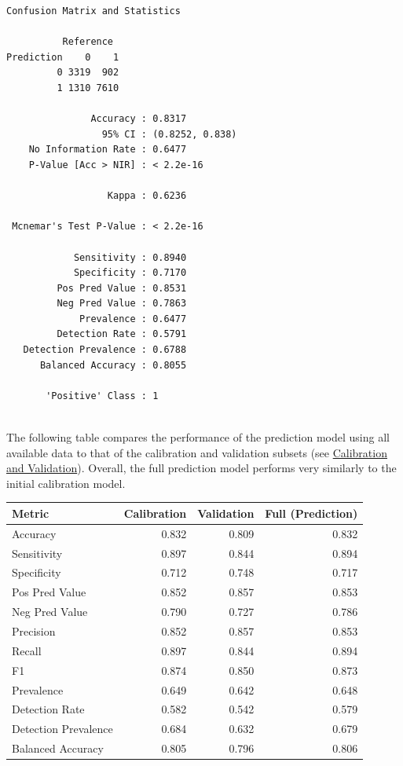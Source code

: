 \documentclass[
]{book}
\begin{document}
\begin{verbatim}
Confusion Matrix and Statistics

          Reference
Prediction    0    1
         0 3319  902
         1 1310 7610
                                         
               Accuracy : 0.8317         
                 95% CI : (0.8252, 0.838)
    No Information Rate : 0.6477         
    P-Value [Acc > NIR] : < 2.2e-16      
                                         
                  Kappa : 0.6236         
                                         
 Mcnemar's Test P-Value : < 2.2e-16      
                                         
            Sensitivity : 0.8940         
            Specificity : 0.7170         
         Pos Pred Value : 0.8531         
         Neg Pred Value : 0.7863         
             Prevalence : 0.6477         
         Detection Rate : 0.5791         
   Detection Prevalence : 0.6788         
      Balanced Accuracy : 0.8055         
                                         
       'Positive' Class : 1              
                                         
\end{verbatim}

The following table compares the performance of the prediction model using all available data to that of the calibration and validation subsets (see \protect\hyperlink{calibration-and-validation}{Calibration and Validation}). Overall, the full prediction model performs very similarly to the initial calibration model.

\begin{tabular}{l|r|r|r}
\hline
Metric & Calibration & Validation & Full (Prediction)\\
\hline
Accuracy & 0.832 & 0.809 & 0.832\\
\hline
Sensitivity & 0.897 & 0.844 & 0.894\\
\hline
Specificity & 0.712 & 0.748 & 0.717\\
\hline
Pos Pred Value & 0.852 & 0.857 & 0.853\\
\hline
Neg Pred Value & 0.790 & 0.727 & 0.786\\
\hline
Precision & 0.852 & 0.857 & 0.853\\
\hline
Recall & 0.897 & 0.844 & 0.894\\
\hline
F1 & 0.874 & 0.850 & 0.873\\
\hline
Prevalence & 0.649 & 0.642 & 0.648\\
\hline
Detection Rate & 0.582 & 0.542 & 0.579\\
\hline
Detection Prevalence & 0.684 & 0.632 & 0.679\\
\hline
Balanced Accuracy & 0.805 & 0.796 & 0.806\\
\hline
\end{tabular}
\end{document}

